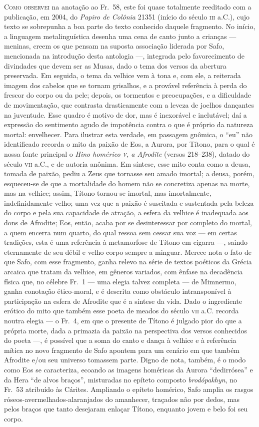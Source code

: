 {\textsc{Como observei} na anotação ao Fr.~58, este foi quase totalmente reeditado com a 
publicação, em 2004, do \textit{Papiro de Colônia} 21351 (início do século \textsc{iii} a.C.), 
cujo texto se sobrepunha a boa parte do texto conhecido daquele fragmento. No início, a 
linguagem metalinguística desenha uma cena de canto junto a crianças --- meninas, creem os 
que pensam na suposta associação liderada por Safo, mencionada na introdução desta antologia ---, 
integrada pelo favorecimento de divindades que devem ser as Musas,
dado o tema dos versos da abertura preservada. Em seguida, o tema da velhice
vem à tona e, com ele, a reiterada imagem dos cabelos que se tornam grisalhos,
e a provável referência à perda do frescor do corpo ou da pele; depois, os
tormentos e preocupações, e a dificuldade de movimentação, que contrasta
drasticamente com a leveza de joelhos dançantes na juventude. Esse quadro é
motivo de dor, mas é inexorável e inelutável; daí a expressão do sentimento
agudo de impotência contra o que é próprio da natureza mortal: envelhecer. Para
ilustrar esta verdade, em passagem gnômica, o “eu” não identificado recorda o
mito da paixão de Eos, a Aurora, por Títono, para o qual é nossa fonte
principal o \textit{Hino homérico \textsc{v}, a Afrodite }(versos 218--238), datado do
século \textsc{vii} a.C., e de autoria anônima. Em síntese, esse mito conta como a
deusa, tomada de paixão, pediu a Zeus que tornasse seu amado imortal; a deusa,
porém, esqueceu-se de que a mortalidade do homem não se concretiza apenas na
morte, mas na velhice; assim, Títono tornou-se imortal, mas imortalmente,
indefinidamente velho; uma vez que a paixão é suscitada e sustentada pela
beleza do corpo e pela sua capacidade de atração, a esfera da velhice é
inadequada aos dons de Afrodite; Eos, então, acaba por se desinteressar por
completo do mortal, a quem encerra num quarto, do qual ressoa sem cessar sua
voz --- em certas tradições, esta é uma referência à metamorfose de Títono em
cigarra ---, saindo eternamente de seu débil e velho corpo sempre a minguar. Merece nota o fato de
que Safo, com esse fragmento, ganha relevo na série de textos poéticos da
Grécia arcaica que tratam da velhice, em gêneros variados, com ênfase na
decadência física que, no célebre Fr.~1 --- uma elegia talvez completa --- de
Mimnermo, ganha conotação ético-moral, e é descrita como obstáculo
intransponível à participação na esfera de Afrodite que é a síntese da vida.
Dado o ingrediente erótico do mito que também esse poeta de meados do século
\textsc{vii} a.C. recorda noutra elegia --- o Fr.~4, em que o presente de Títono é
julgado pior do que a própria morte, dada a primazia da paixão na perspectiva
dos versos conhecidos do poeta ---, é possível que a soma do canto e dança à
velhice e à referência mítica no novo fragmento de Safo apontem para um cenário
em que também Afrodite e/ou seu universo tomassem parte. Digno de nota, também,
é o modo como Eos se caracteriza, ecoando as imagens homéricas da Aurora
``dedirrósea” e da Hera ``de alvos braços”, misturadas no
epíteto composto \textit{brodópakhyn}, no Fr.~53 atribuído às Cárites.
Ampliando o epíteto homérico, Safo amplia os rasgos
róseos-avermelhados-alaranjados do amanhecer, traçados não por dedos, mas pelos
braços que tanto desejaram enlaçar Títono, enquanto jovem e belo foi seu
corpo.


}
